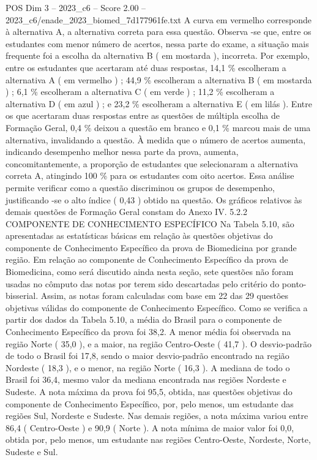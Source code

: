 \begin{textsample}{POS Dim 3 – 2023\_c6 – Score 2.00 – 2023\_c6/enade\_2023\_biomed\_7d177961fe.txt}
A curva em vermelho corresponde à alternativa A, a alternativa correta para essa questão.
Observa -se que, entre os estudantes com menor número de acertos, nessa parte do exame, a situação mais frequente foi a escolha da alternativa B ( em mostarda ), incorreta.
Por exemplo, entre os estudantes que acertaram até duas respostas, 14,1 \% escolheram a alternativa A ( em vermelho ) ; 44,9 \% escolheram a alternativa B ( em mostarda ) ; 6,1 \% escolheram a alternativa C ( em verde ) ; 11,2 \% escolheram a alternativa D ( em azul ) ; e 23,2 \% escolheram a alternativa E ( em lilás ).
Entre os que acertaram duas respostas entre as questões de múltipla escolha de Formação Geral, 0,4 \% deixou a questão em branco e 0,1 \% marcou mais de uma alternativa, invalidando a questão.
À medida que o número de acertos aumenta, indicando desempenho melhor nessa parte da prova, aumenta, concomitantemente, a proporção de estudantes que selecionaram a alternativa correta A, atingindo 100 \% para os estudantes com oito acertos.
Essa análise permite verificar como a questão discriminou os grupos de desempenho, justificando -se o alto índice ( 0,43 ) obtido na questão.
Os gráficos relativos às demais questões de Formação Geral constam do Anexo IV. 5.2.2 COMPONENTE DE CONHECIMENTO ESPECÍFICO Na Tabela 5.10, são apresentadas as estatísticas básicas em relação às questões objetivas do componente de Conhecimento Específico da prova de Biomedicina por grande região.
Em relação ao componente de Conhecimento Específico da prova de Biomedicina, como será discutido ainda nesta seção, sete questões não foram usadas no cômputo das notas por terem sido descartadas pelo critério do ponto-bisserial.
Assim, as notas foram calculadas com base em 22 das 29 questões objetivas válidas do componente de Conhecimento Específico.
Como se verifica a partir dos dados da Tabela 5.10, a média do Brasil para o componente de Conhecimento Específico da prova foi 38,2.
A menor média foi observada na região Norte ( 35,0 ), e a maior, na região Centro-Oeste ( 41,7 ).
O desvio-padrão de todo o Brasil foi 17,8, sendo o maior desvio-padrão encontrado na região Nordeste ( 18,3 ), e o menor, na região Norte ( 16,3 ).
A mediana de todo o Brasil foi 36,4, mesmo valor da mediana encontrada nas regiões Nordeste e Sudeste.
A nota máxima da prova foi 95,5, obtida, nas questões objetivas do componente de Conhecimento Específico, por, pelo menos, um estudante das regiões Sul, Nordeste e Sudeste.
Nas demais regiões, a nota máxima variou entre 86,4 ( Centro-Oeste ) e 90,9 ( Norte ).
A nota mínima de maior valor foi 0,0, obtida por, pelo menos, um estudante nas regiões Centro-Oeste, Nordeste, Norte, Sudeste e Sul.

\end{textsample}
